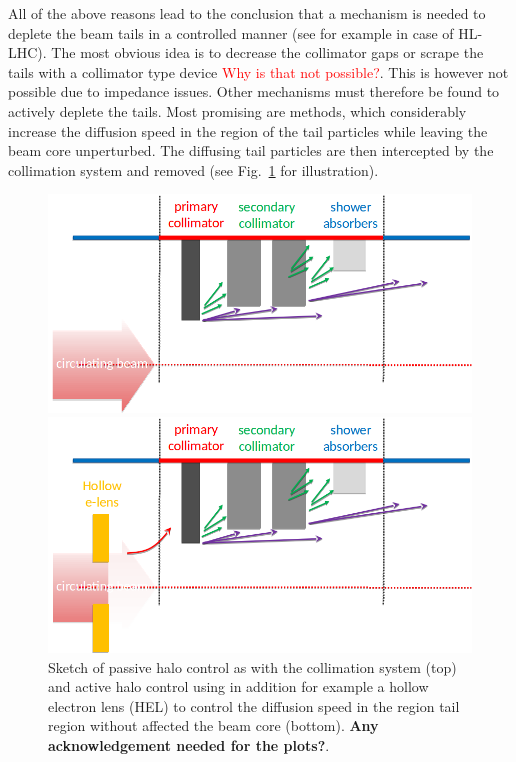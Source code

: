 \documentclass[%
 reprint,
 amsmath,amssymb,
 aps,
prstab,
]{revtex4-1}
\begin{document}
All of the above reasons lead to the conclusion that a mechanism is needed to deplete the beam tails in a controlled manner (see for example \cite{helreview} in case of HL-LHC). The most obvious idea is to decrease the collimator gaps or scrape the tails with a collimator type device \textcolor{red}{Why is that not possible?}. This is however not possible due to impedance issues. Other mechanisms must therefore be found to actively deplete the tails. Most promising are methods, which considerably increase the diffusion speed in the region of the tail particles while leaving the beam core unperturbed. The diffusing tail particles are then intercepted by the collimation system and removed (see Fig.~\ref{fig:active_halo_control} for illustration).
\begin{figure}[h]
	\begin{minipage}[t]{0.49\linewidth}
		\centering
		\includegraphics[width=1.0\linewidth]{passive_halo_control.png}
	\end{minipage}
	\begin{minipage}[t]{0.49\linewidth}
		\centering
		\includegraphics[width=1.0\linewidth]{active_halo_control.png}
	\end{minipage}	
	\caption{\label{fig:active_halo_control} Sketch of passive halo control as with the collimation system (top) and active halo control using in addition for example a hollow electron lens (HEL) to control the diffusion speed in the region tail region without affected the beam core (bottom). \textbf{Any acknowledgement needed for the plots?}.}
\end{figure}
\end{document}
